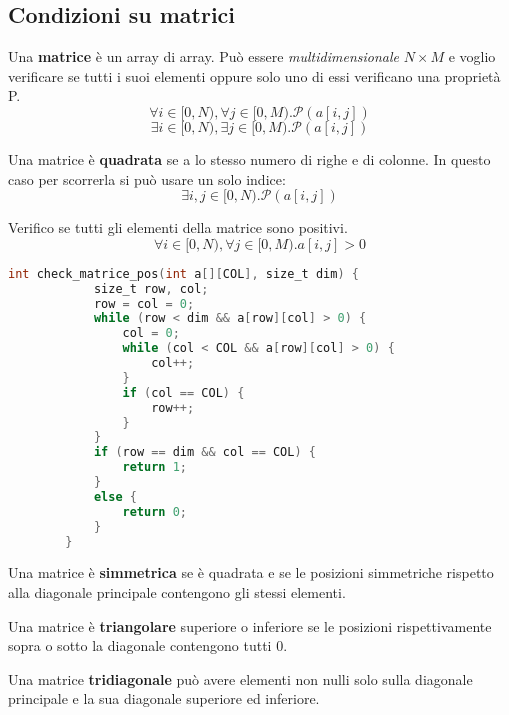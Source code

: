 \subsection{Condizioni su matrici}
Una \textbf{matrice} è un array di array. Può essere \textit{multidimensionale} $N \times M$ e voglio verificare se tutti i suoi elementi oppure solo uno di essi verificano una proprietà P.
\begin{equation}
	\forall i \in [0, N), \forall j \in [0,M).\mathcal{P}(a[i,j])
\end{equation}
\begin{equation}
	\exists i \in [0, N), \exists j \in [0,M).\mathcal{P}(a[i,j])
\end{equation}
\begin{definition}
	Una matrice è \textbf{quadrata} se a lo stesso numero di righe e di colonne. In questo caso per scorrerla si può usare un solo indice:
	\begin{equation}
		\exists i,j \in [0, N).\mathcal{P}(a[i,j])
	\end{equation}
\end{definition}

\begin{example}
	Verifico se tutti gli elementi della matrice sono positivi.
	\begin{equation}
		\forall i \in [0, N), \forall j \in [0, M) . a[i, j] > 0
	\end{equation}
	\begin{lstlisting}[language=C, caption=Verifica di proprietà su tutti gli elementi della matrice, mathescape=true]
		int check_matrice_pos(int a[][COL], size_t dim) {
			size_t row, col;
			row = col = 0;
			while (row < dim && a[row][col] > 0) {
				col = 0;
				while (col < COL && a[row][col] > 0) {
					col++;
				}
				if (col == COL) {
					row++;
				}
			}
			if (row == dim && col == COL) {
				return 1;
			}
			else {
				return 0;
			}
		}
	\end{lstlisting}
\end{example}
\begin{definition}
	Una matrice è \textbf{simmetrica} se è quadrata e se le posizioni simmetriche rispetto alla diagonale principale contengono gli stessi elementi.
\end{definition}
\begin{definition}
	Una matrice è \textbf{triangolare} superiore o inferiore se le posizioni rispettivamente sopra o sotto la diagonale contengono tutti 0.
\end{definition}
\begin{definition}
	Una matrice \textbf{tridiagonale} \color{red} può \color{black} avere elementi non nulli solo sulla diagonale principale e la sua diagonale superiore ed inferiore.
\end{definition}

